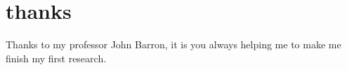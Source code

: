 

\chapter*{thanks}

Thanks to my professor John Barron, it is you always helping me to make me finish my first research.\\





